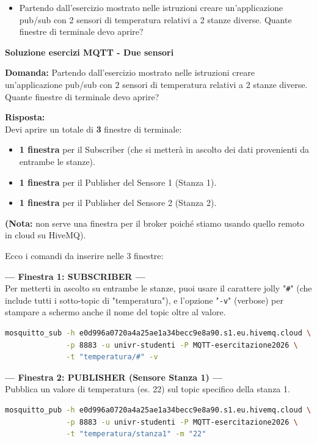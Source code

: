 \documentclass[11pt]{article}
\begin{document}
\begin{tcolorbox}[colback=blue!5!white,colframe=blue!75!black,title=\textbf{DOMANDA}, breakable]
\begin{itemize}
    \item Partendo dall'esercizio mostrato nelle istruzioni creare un'applicazione pub/sub con 2 sensori di temperatura relativi a 2 stanze diverse. Quante finestre di terminale devo aprire?
\end{itemize}
\end{tcolorbox}

\begin{tcolorbox}[colback=green!5!white,colframe=green!75!black,title=\textbf{RISPOSTA}, breakable]
\textbf{Soluzione esercizi MQTT - Due sensori}

\textbf{Domanda:} Partendo dall'esercizio mostrato nelle istruzioni creare un'applicazione pub/sub con 2 sensori di temperatura relativi a 2 stanze diverse. Quante finestre di terminale devo aprire?

\textbf{Risposta:}\\
Devi aprire un totale di \textbf{3} finestre di terminale:
\begin{itemize}
    \item \textbf{1 finestra} per il Subscriber (che si metterà in ascolto dei dati provenienti da entrambe le stanze).
    \item \textbf{1 finestra} per il Publisher del Sensore 1 (Stanza 1).
    \item \textbf{1 finestra} per il Publisher del Sensore 2 (Stanza 2).
\end{itemize}
\textbf{(Nota:} non serve una finestra per il broker poiché stiamo usando quello remoto in cloud su HiveMQ).

Ecco i comandi da inserire nelle 3 finestre:

\textbf{--- Finestra 1: SUBSCRIBER ---}\\
Per metterti in ascolto su entrambe le stanze, puoi usare il carattere jolly "\texttt{\#}" (che include tutti i sotto-topic di "temperatura"), e l'opzione "\texttt{-v}" (verbose) per stampare a schermo anche il nome del topic oltre al valore.
\begin{lstlisting}[language=bash, basicstyle=\ttfamily\small]
mosquitto_sub -h e0d996a0720a4a25ae1a34becc9e8a90.s1.eu.hivemq.cloud \
              -p 8883 -u univr-studenti -P MQTT-esercitazione2026 \
              -t "temperatura/#" -v
\end{lstlisting}

\textbf{--- Finestra 2: PUBLISHER (Sensore Stanza 1) ---}\\
Pubblica un valore di temperatura (es. 22) sul topic specifico della stanza 1.
\begin{lstlisting}[language=bash, basicstyle=\ttfamily\small]
mosquitto_pub -h e0d996a0720a4a25ae1a34becc9e8a90.s1.eu.hivemq.cloud \
              -p 8883 -u univr-studenti -P MQTT-esercitazione2026 \
              -t "temperatura/stanza1" -m "22"
\end{lstlisting}


\end{tcolorbox}
\end{document}
